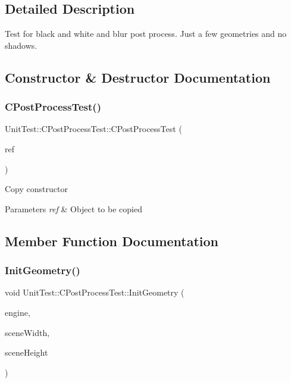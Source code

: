\subsection{Detailed Description}
Test for black and white and blur post process. Just a few geometries and no shadows. 

\subsection{Constructor \& Destructor Documentation}
\mbox{\label{class_unit_test_1_1_c_post_process_test_ab432ec90a2fe56772f244e0640d55c37}} 
\subsubsection{\texorpdfstring{CPostProcessTest()}{CPostProcessTest()}}
{\footnotesize\ttfamily Unit\+Test\+::\+C\+Post\+Process\+Test\+::\+C\+Post\+Process\+Test (\begin{DoxyParamCaption}\item[{const \mbox{\hyperlink{class_unit_test_1_1_c_post_process_test}{C\+Post\+Process\+Test}} \&}]{ref }\end{DoxyParamCaption})\hspace{0.3cm}{\ttfamily [inline]}}

Copy constructor 
\begin{DoxyParams}{Parameters}
{\em ref} & Object to be copied \\
\hline
\end{DoxyParams}


\subsection{Member Function Documentation}
\mbox{\label{class_unit_test_1_1_c_post_process_test_ab88ae9fbbdcee0f63328d73f9b5e499d}} 
\subsubsection{\texorpdfstring{InitGeometry()}{InitGeometry()}}
{\footnotesize\ttfamily void Unit\+Test\+::\+C\+Post\+Process\+Test\+::\+Init\+Geometry (\begin{DoxyParamCaption}\item[{\mbox{\hyperlink{class_geometry_engine_1_1_geometry_engine}{Geometry\+Engine\+::\+Geometry\+Engine}} $\ast$}]{engine,  }\item[{int}]{scene\+Width,  }\item[{int}]{scene\+Height }\end{DoxyParamCaption})\hspace{0.3cm}{\ttfamily [virtual]}}

